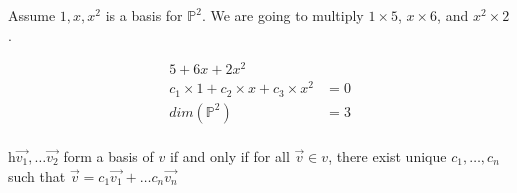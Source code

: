   \begin{problem}
    Assume $1,x,x^2$ is a basis for $\mathbb{P}^2$. We are going to multiply $1\times5$, $x\times6$, and $x^2\times2$.

    \begin{align*}
      5+6x+2x^2&\\
      c_1\times1+c_2\times x+c_3\times x^2&=0\\
      dim(\mathbb{P}^2)&=3\\
    \end{align*}
  \end{problem}

  \begin{theorem}
   h$\vec{v_1},\dots\vec{v_2}$ form a basis of $v$ if and only if for all $\vec{v}\in v$, there exist unique $c_{1},\dots,c_{n}$ such that $\vec{v}=c_1\vec{v_1}+\dots c_n\vec{v_n}$
  \end{theorem}

